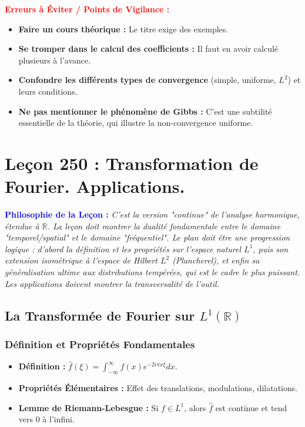 \documentclass[12pt, a4paper, parskip=full]{report}
\theoremstyle{agregstyle}
\newenvironment{philosophie}
  {\par\medskip\noindent\begin{oframed}\noindent\textbf{\textcolor{blue}{Philosophie de la Leçon :}}\itshape}
  {\end{oframed}\par\medskip}
\newenvironment{erreurs}
  {\par\medskip\noindent\begin{oframed}\noindent\textbf{\textcolor{red}{Erreurs à Éviter / Points de Vigilance :}}}
  {\end{oframed}\par\medskip}
\begin{document}
\begin{erreurs}
    \begin{itemize}
        \item \textbf{Faire un cours théorique :} Le titre exige des exemples.
        \item \textbf{Se tromper dans le calcul des coefficients :} Il faut en avoir calculé plusieurs à l'avance.
        \item \textbf{Confondre les différents types de convergence} (simple, uniforme, $L^2$) et leurs conditions.
        \item \textbf{Ne pas mentionner le phénomène de Gibbs :} C'est une subtilité essentielle de la théorie, qui illustre la non-convergence uniforme.
    \end{itemize}
\end{erreurs}
\chapter{Leçon 250 : Transformation de Fourier. Applications.}

\begin{philosophie}
    C'est la version "continue" de l'analyse harmonique, étendue à $\mathbb{R}$. La leçon doit montrer la dualité fondamentale entre le domaine "temporel/spatial" et le domaine "fréquentiel". Le plan doit être une progression logique : d'abord la définition et les propriétés sur l'espace naturel $L^1$, puis son extension isométrique à l'espace de Hilbert $L^2$ (Plancherel), et enfin sa généralisation ultime aux distributions tempérées, qui est le cadre le plus puissant. Les applications doivent montrer la transversalité de l'outil.
\end{philosophie}

\section{La Transformée de Fourier sur $L^1(\mathbb{R})$}
\subsection{Définition et Propriétés Fondamentales}
\begin{itemize}
    \item \textbf{Définition :} $\hat{f}(\xi) = \int_{-\infty}^\infty f(x) e^{-2i\pi x \xi} dx$.
    \item \textbf{Propriétés Élémentaires :} Effet des translations, modulations, dilatations.
    \item \textbf{Lemme de Riemann-Lebesgue :} Si $f \in L^1$, alors $\hat{f}$ est continue et tend vers 0 à l'infini.
\end{itemize}
\end{document}
